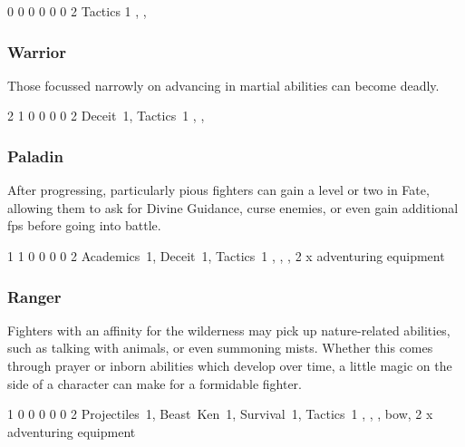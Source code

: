 {\begin{multicols}{2}

{0}%
{0}%
{{0}%
{0}%
{0}}%
{0}%
{2}%
{Tactics 1\knacks{\adrenalinesurge}}%
{\longsword, \partialleather, \bucklar}%
{\addtocounter{fp}{5}}

\subsubsection{Warrior}

Those focussed narrowly on advancing in martial abilities can become deadly.


{2}%
{1}%
{{0}%
{0}%
{0}}%
{0}%
{2}%
{Deceit~1, Tactics~1\knacks{\adrenalinesurge, \charge, \firststrike}}%
{\longsword, \partialchain, \bucklar}%
{\addtocounter{fp}{5}}

\subsubsection{Paladin}

After progressing, particularly pious fighters can gain a level or two in Fate, allowing them to ask for Divine Guidance, curse enemies, or even gain additional \glspl{fp} before going into battle.


{1}%
{1}%
{{0}%
{0}%
{0}}%
{0}%
{2}%
{Academics~1, Deceit~1, Tactics~1\knacks{\adrenalinesurge, \charge}}%
{\greatsword, \partialchain, \bucklar, 2 x adventuring equipment}%
{\addtocounter{fp}{10}}

\subsubsection{Ranger}

Fighters with an affinity for the wilderness may pick up nature-related abilities, such as talking with animals, or even summoning mists.
Whether this comes through prayer or inborn abilities which develop over time, a little magic on the side of a character can make for a formidable fighter.


{1}%
{0}%
{{0}%
{0}%
{0}}%
{0}%
{2}%
{Projectiles~1, Beast~Ken~1, Survival~1, Tactics~1\knacks{\mightydraw, \charge}}%
{\longsword, \partialchain, \bucklar, bow, 2 x adventuring equipment}%
{\addtocounter{fp}{10}}



\end{multicols}

}{}

